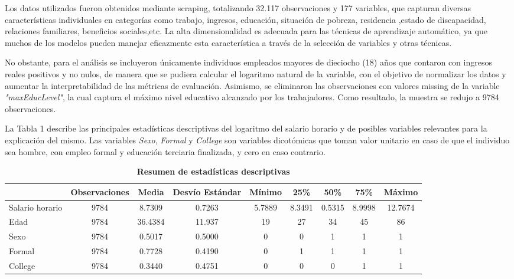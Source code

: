 \documentclass[11pt, a4paper]{article}
\begin{document}
Los datos utilizados fueron obtenidos mediante scraping, totalizando 32.117 observaciones y 177 variables, que capturan diversas características individuales en categorías como trabajo, ingresos, educación, situación de pobreza, residencia ,estado de discapacidad, relaciones familiares, beneficios sociales,etc.  La alta dimensionalidad es adecuada para las técnicas de aprendizaje automático, ya que muchos de los modelos pueden manejar eficazmente esta característica a través de la selección de variables y otras técnicas.

No obstante, para el análisis se incluyeron únicamente individuos empleados mayores de dieciocho (18) años que contaron con ingresos reales positivos y no nulos, de manera que se pudiera calcular el logaritmo natural de la variable, con el objetivo de normalizar los datos y aumentar la interpretabilidad de las métricas de evaluación. Asimismo, se eliminaron las observaciones con valores missing de la variable \textit{"maxEducLevel"}, la cual captura el máximo nivel educativo alcanzado por los trabajadores. Como resultado, la muestra se redujo a 9784 observaciones. 
 
La Tabla 1 describe las principales estadísticas descriptivas del logaritmo del salario horario y de posibles variables relevantes para la explicación del mismo. Las variables \textit{Sexo}, \textit{Formal} y \textit{College} son variables dicotómicas que toman valor unitario en caso de que el individuo sea hombre, con empleo formal y educación terciaria finalizada, y cero en caso contrario.

\begin{table}[ht]
    \centering
    \caption*{\textbf{Resumen de estadísticas descriptivas}}
    \begin{adjustbox}{max width=\textwidth}
        \begin{tabular}{lcccccccc}
            \toprule
            & \textbf{Observaciones} & \textbf{Media} & \textbf{Desvío Estándar} & \textbf{Mínimo} & \textbf{25\%} & \textbf{50\%} & \textbf{75\%} & \textbf{Máximo} \\
            \midrule
            Salario horario        & 9784 & 8.7309 & 0.7263 & 5.7889 & 8.3491 & 0.5315 & 8.9998 & 12.7674 \\
            Edad                       & 9784 & 36.4384  & 11.937 & 19  & 27   & 34   & 45   & 86     \\
            Sexo                       & 9784 & 0.5017  & 0.5000 & 0   & 0    & 1    & 1    & 1      \\
            Formal                   & 9784 & 0.7728   & 0.4190 & 0   & 1    & 1    & 1    & 1      \\
            College                  & 9784 &  0.3440   &  0.4751 & 0   & 0 & 0    & 1    & 1      \\
            \bottomrule
        \end{tabular}
    \end{adjustbox}
\end{table}
\end{document}
